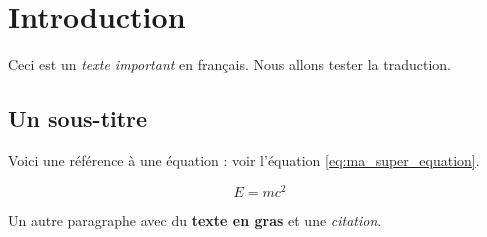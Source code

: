 \documentclass{article}
\begin{document}
\section{Introduction}
Ceci est un \emph{texte important} en français. Nous allons tester la traduction.

\subsection{Un sous-titre}
Voici une référence à une équation : voir l'équation \ref{eq:ma_super_equation}.

\begin{equation}
    E=mc^2 \label{eq:ma_super_equation}
\end{equation}

Un autre paragraphe avec du \textbf{texte en gras} et une \textit{citation}.
\end{document}
